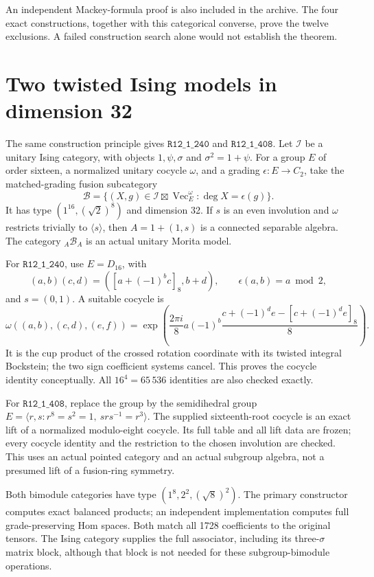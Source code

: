 \documentclass[11pt]{article}
\newcommand{\R}[1]{\texttt{R12\_1\_#1}}
\renewcommand{\Vec}{\operatorname{Vec}}
\begin{document}
An independent Mackey-formula proof is also included in the archive.
The four exact constructions, together with this categorical converse,
prove the twelve exclusions. A failed construction search alone would
not establish the theorem.

\section{Two twisted Ising models in dimension 32}
The same construction principle gives $\R{240}$ and $\R{408}$.
Let $\mathcal I$ be a unitary Ising category, with objects
$1,\psi,\sigma$ and $\sigma^2=1+\psi$. For a group $E$ of order sixteen,
a normalized unitary cocycle $\omega$, and a grading
$\epsilon:E\to C_2$, take the matched-grading fusion subcategory
\[
\mathcal B=\{(X,g)\in\mathcal I\boxtimes\Vec_E^\omega:
                  \deg X=\epsilon(g)\}.
\]
It has type $(1^{16},(\sqrt2)^8)$ and dimension 32.
If $s$ is an even involution and $\omega$ restricts trivially to
$\langle s\rangle$, then $A=1+(1,s)$ is a connected separable algebra.
The category ${}_A\mathcal B_A$ is an actual unitary Morita model.

For $\R{240}$, use $E=D_{16}$, with
\[
(a,b)(c,d)=([a+(-1)^bc]_8,b+d),\qquad \epsilon(a,b)=a\bmod2,
\]
and $s=(0,1)$. A suitable cocycle is
\[
\omega((a,b),(c,d),(e,f))=
\exp\!\left(\frac{2\pi i}{8}a(-1)^b
      \frac{c+(-1)^de-[c+(-1)^de]_8}{8}\right).
\]
It is the cup product of the crossed rotation coordinate with its twisted
integral Bockstein; the two sign coefficient systems cancel.
This proves the cocycle identity conceptually. All $16^4=65\,536$
identities are also checked exactly.

For $\R{408}$, replace the group by the semidihedral group
$E=\langle r,s:r^8=s^2=1,\ srs^{-1}=r^3\rangle$.
The supplied sixteenth-root cocycle is an exact lift of a normalized
modulo-eight cocycle. Its full table and all lift data are frozen; every
cocycle identity and the restriction to the chosen involution are
checked. This uses an actual pointed category and an actual subgroup
algebra, not a presumed lift of a fusion-ring symmetry.

Both bimodule categories have type $(1^8,2^2,(\sqrt8)^2)$.
The primary constructor computes exact balanced products; an independent
implementation computes full grade-preserving Hom spaces. Both match all
1728 coefficients to the original tensors. The Ising category supplies
the full associator, including its three-$\sigma$ matrix block, although
that block is not needed for these subgroup-bimodule operations.
\end{document}
